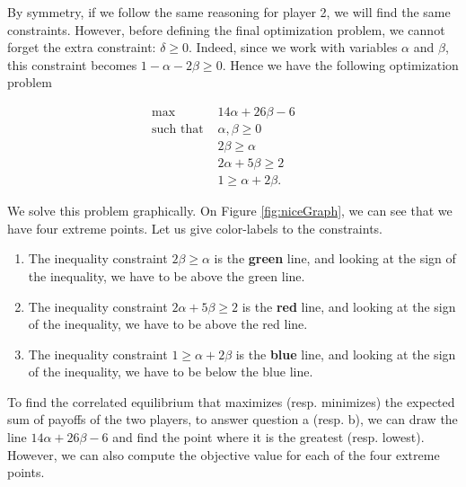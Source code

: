By symmetry, if we follow the same reasoning for player 2, we will find the same constraints. However, before defining the final optimization problem, we cannot forget the extra constraint: $\delta \geq 0$. Indeed, since we work with variables $\alpha$ and $\beta$, this constraint becomes $1 - \alpha - 2 \beta \geq 0 $.
Hence we have the following optimization problem

\begin{equation*}
    \begin{aligned}
    \underset{}{\text{max }} &
    14 \alpha + 26 \beta - 6 & & \\
    \text{such that  } &
        \alpha, \beta \geq 0 & \\
        & 2 \beta \geq \alpha & \\
        & 2 \alpha + 5 \beta \geq 2 & \\
        & 1 \geq \alpha + 2 \beta. &
    \end{aligned}
    \end{equation*}


We solve this problem graphically. On Figure \ref{fig:niceGraph}, we can see that we have four extreme points. Let us give color-labels to the constraints.
\begin{enumerate}
    \item The inequality constraint $2 \beta \geq \alpha$ is the \textbf{green} line, and looking at the sign of the inequality, we have to be above the green line.
    \item The inequality constraint $2 \alpha + 5 \beta \geq 2$ is the \textbf{red} line, and looking at the sign of the inequality, we have to be above the red line.
    \item The inequality constraint $1 \geq \alpha + 2 \beta$ is the \textbf{blue} line, and looking at the sign of the inequality, we have to be below the blue line.
\end{enumerate}

\begin{center}
    
    \label{fig:niceGraph}
\end{center}




To find the correlated equilibrium that maximizes (resp. minimizes) the expected sum of payoffs of the two players, to answer question a (resp. b), we can draw the line $14 \alpha + 26 \beta - 6$ and find the point where it is the greatest (resp. lowest). However, we can also compute the objective value for each of the four extreme points.

